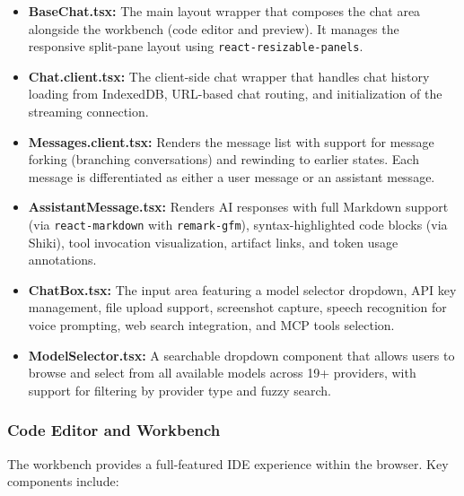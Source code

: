 \documentclass[12pt,a4paper,openany]{report}
\begin{document}
\begin{itemize}
    \item \textbf{BaseChat.tsx:} The main layout wrapper that composes the chat area alongside the workbench (code editor and preview). It manages the responsive split-pane layout using \texttt{react-resizable-panels}.
    \item \textbf{Chat.client.tsx:} The client-side chat wrapper that handles chat history loading from IndexedDB, URL-based chat routing, and initialization of the streaming connection.
    \item \textbf{Messages.client.tsx:} Renders the message list with support for message forking (branching conversations) and rewinding to earlier states. Each message is differentiated as either a user message or an assistant message.
    \item \textbf{AssistantMessage.tsx:} Renders AI responses with full Markdown support (via \texttt{react-markdown} with \texttt{remark-gfm}), syntax-highlighted code blocks (via Shiki), tool invocation visualization, artifact links, and token usage annotations.
    \item \textbf{ChatBox.tsx:} The input area featuring a model selector dropdown, API key management, file upload support, screenshot capture, speech recognition for voice prompting, web search integration, and MCP tools selection.
    \item \textbf{ModelSelector.tsx:} A searchable dropdown component that allows users to browse and select from all available models across 19+ providers, with support for filtering by provider type and fuzzy search.
\end{itemize}

\subsubsection{Code Editor and Workbench}
The workbench provides a full-featured IDE experience within the browser. Key components include:
\end{document}
